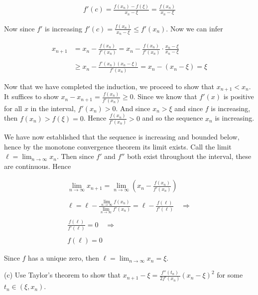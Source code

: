 \documentclass{article}
\begin{document}
  \begin{align*}
    f'(c)=\frac{f(x_n)-f(\xi)}{x_n-\xi} = \frac{f(x_n)}{x_n-\xi}
  \end{align*}

  Now since $f'$ is increasing $f'(c)=\frac{f(x_n)}{x_n-\xi}\leq f'(x_n)$.  Now we can infer

  \begin{align*}
    x_{n+1}&=x_n-\frac{f(x_n)}{f'(x_n)} = x_n-\frac{f(x_n)}{f'(x_n)}\cdot \frac{x_n-\xi}{x_n-\xi} \\\\
    &\geq x_n-\frac{f'(x_n)(x_n-\xi)}{f'(x_n)}=x_n-(x_n-\xi)=\xi
  \end{align*}

  Now that we have completed the induction, we proceed to show that $x_{n+1}<x_n$.  It suffices to show $x_n-x_{n+1}=\frac{f(x_n)}{f'(x_n)}\geq 0$.  Since we know that $f'(x)$ is positive for all $x$ in the interval, $f'(x_n)>0$.  And since $x_n>\xi$ and since $f$ is increasing, then $f(x_n)>f(\xi)=0$.  Hence $\frac{f(x_n)}{f'(x_n)}>0$ and so the sequence $x_n$ is increasing.

  We have now established that the sequence is increasing and bounded below, hence by the monotone convergence theorem its limit exists.  Call the limit $\ell = \displaystyle\lim_{n\to\infty}x_n$.  Then since $f'$ and $f''$ both exist throughout the interval, these are continuous.  Hence

  \begin{align*}
    \lim_{n\to\infty}x_{n+1}=\lim_{n\to\infty}\left(x_n-\frac{f(x_n)}{f'(x_n)}\right) \\\\
    \ell = \ell - \frac{\lim_{n\to \infty}f(x_n)}{\lim_{n\to\infty}f'(x_n)}=\ell-\frac{f(\ell)}{f'(\ell)} \quad \Rightarrow \\\\
    \frac{f(\ell)}{f'(\ell)}=0\quad \Rightarrow \\\\
    f(\ell)=0
  \end{align*}

  Since $f$ has a unique zero, then $\ell = \displaystyle\lim_{n\to\infty}x_n=\xi$.

  \vspace{1cm}

  {\Large \color{Sepia} (c) Use Taylor's theorem to show that $x_{n+1}-\xi = \frac{f''(t_n)}{2f'(x_n)}(x_n-\xi)^2$ for some $t_n\in(\xi,x_n)$.}

  \vspace{1cm}
\end{document}
